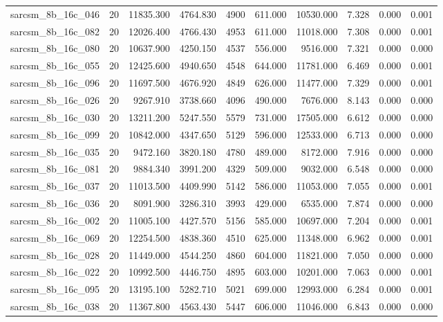 \begin{tabular}{lrrrrrrrrr}
sarcsm\_8b\_16c\_046 & 20 & 11835.300 & 4764.830 & 4900 & 611.000 & 10530.000 & 7.328 & 0.000 & 0.001 \\
sarcsm\_8b\_16c\_082 & 20 & 12026.400 & 4766.430 & 4953 & 611.000 & 11018.000 & 7.308 & 0.000 & 0.001 \\
sarcsm\_8b\_16c\_080 & 20 & 10637.900 & 4250.150 & 4537 & 556.000 & 9516.000 & 7.321 & 0.000 & 0.000 \\
sarcsm\_8b\_16c\_055 & 20 & 12425.600 & 4940.650 & 4548 & 644.000 & 11781.000 & 6.469 & 0.000 & 0.001 \\
sarcsm\_8b\_16c\_096 & 20 & 11697.500 & 4676.920 & 4849 & 626.000 & 11477.000 & 7.329 & 0.000 & 0.001 \\
sarcsm\_8b\_16c\_026 & 20 & 9267.910 & 3738.660 & 4096 & 490.000 & 7676.000 & 8.143 & 0.000 & 0.000 \\
sarcsm\_8b\_16c\_030 & 20 & 13211.200 & 5247.550 & 5579 & 731.000 & 17505.000 & 6.612 & 0.000 & 0.000 \\
sarcsm\_8b\_16c\_099 & 20 & 10842.000 & 4347.650 & 5129 & 596.000 & 12533.000 & 6.713 & 0.000 & 0.000 \\
sarcsm\_8b\_16c\_035 & 20 & 9472.160 & 3820.180 & 4780 & 489.000 & 8172.000 & 7.916 & 0.000 & 0.000 \\
sarcsm\_8b\_16c\_081 & 20 & 9884.340 & 3991.200 & 4329 & 509.000 & 9032.000 & 6.548 & 0.000 & 0.000 \\
sarcsm\_8b\_16c\_037 & 20 & 11013.500 & 4409.990 & 5142 & 586.000 & 11053.000 & 7.055 & 0.000 & 0.001 \\
sarcsm\_8b\_16c\_036 & 20 & 8091.900 & 3286.310 & 3993 & 429.000 & 6535.000 & 7.874 & 0.000 & 0.000 \\
sarcsm\_8b\_16c\_002 & 20 & 11005.100 & 4427.570 & 5156 & 585.000 & 10697.000 & 7.204 & 0.000 & 0.001 \\
sarcsm\_8b\_16c\_069 & 20 & 12254.500 & 4838.360 & 4510 & 625.000 & 11348.000 & 6.962 & 0.000 & 0.001 \\
sarcsm\_8b\_16c\_028 & 20 & 11449.000 & 4544.250 & 4860 & 604.000 & 11821.000 & 7.050 & 0.000 & 0.000 \\
sarcsm\_8b\_16c\_022 & 20 & 10992.500 & 4446.750 & 4895 & 603.000 & 10201.000 & 7.063 & 0.000 & 0.001 \\
sarcsm\_8b\_16c\_095 & 20 & 13195.100 & 5282.710 & 5021 & 699.000 & 12993.000 & 6.284 & 0.000 & 0.001 \\
sarcsm\_8b\_16c\_038 & 20 & 11367.800 & 4563.430 & 5447 & 606.000 & 11046.000 & 6.843 & 0.000 & 0.000 \\

\end{tabular}
